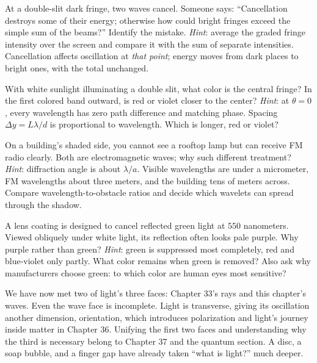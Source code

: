 \begin{puzzles}
\item At a double-slit dark fringe, two waves cancel. Someone says: ``Cancellation destroys some of their energy; otherwise how could bright fringes exceed the simple sum of the beams?'' Identify the mistake. \emph{Hint}: average the graded fringe intensity over the screen and compare it with the sum of separate intensities. Cancellation affects oscillation at \emph{that point}; energy moves from dark places to bright ones, with the total unchanged.
\item With white sunlight illuminating a double slit, what color is the central fringe? In the first colored band outward, is red or violet closer to the center? \emph{Hint}: at \(\theta=0\), every wavelength has zero path difference and matching phase. Spacing \(\Delta y=L\lambda/d\) is proportional to wavelength. Which is longer, red or violet?
\item On a building's shaded side, you cannot see a rooftop lamp but can receive FM radio clearly. Both are electromagnetic waves; why such different treatment? \emph{Hint}: diffraction angle is about \(\lambda/a\). Visible wavelengths are under a micrometer, FM wavelengths about three meters, and the building tens of meters across. Compare wavelength-to-obstacle ratios and decide which wavelets can spread through the shadow.
\item A lens coating is designed to cancel reflected green light at \(550\) nanometers. Viewed obliquely under white light, its reflection often looks pale purple. Why purple rather than green? \emph{Hint}: green is suppressed most completely, red and blue-violet only partly. What color remains when green is removed? Also ask why manufacturers choose green: to which color are human eyes most sensitive?
\end{puzzles}

We have now met two of light's three faces: Chapter 33's rays and this chapter's waves. Even the wave face is incomplete. Light is transverse, giving its oscillation another dimension, orientation, which introduces polarization and light's journey inside matter in Chapter 36. Unifying the first two faces and understanding why the third is necessary belong to Chapter 37 and the quantum section. A disc, a soap bubble, and a finger gap have already taken ``what is light?'' much deeper.
